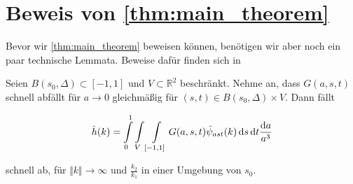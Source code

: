 \section{Beweis von \cref{thm:main_theorem}} %
\label{sec:beweis_von_thm:main_theorem}


Bevor wir \cref{thm:main_theorem} beweisen können, benötigen wir aber noch ein paar technische Lemmata. Beweise dafür finden sich in \textcite{Kutyniok2008}

\begin{lemma}
\label{lemm:ruecktrafo_fourier_faellt_schnell_ab}

Seien $B(s_0,\Delta) \subset [-1,1]$ und $V \subset \mathbb{R}^2$ beschränkt. Nehme an, dass $G(a,s,t)$ schnell abfällt für $a \to 0$ gleichmäßig für $(s,t) \in  B(s_0,\Delta) \times V$. Dann fällt

\begin{equation*}
    \hat h(k) = \int \limits_0^1 \int \limits_V \int \limits_{[-1,1]}
    G(a,s,t) \hat \psi_{ast} (k)
        \mathop{}\!\mathrm{d} s \mathop{}\!\mathrm{d} t \frac{\mathop{}\!\mathrm{d} a}{a^3}
\end{equation*}

schnell ab, für $\Vert k \Vert \to \infty$ und $\frac{k_2}{k_1}$ in einer Umgebung von $s_0$.
\end{lemma}


